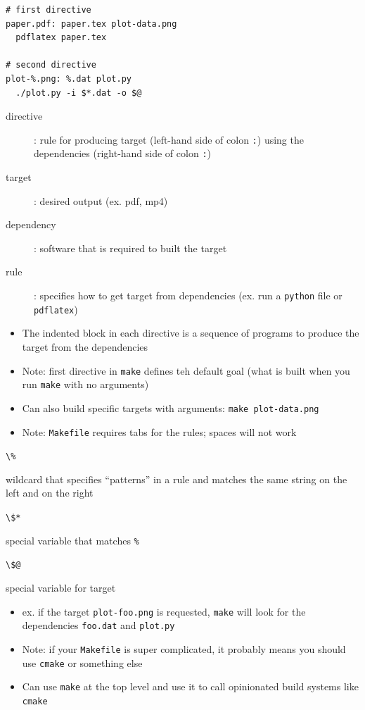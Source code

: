 \documentclass[letterpaper,12pt]{article}
\newcommand*{\lstitem}[1]{
  \setbox0\hbox{\lstinline{#1}}
  \item[\usebox0]
}
\begin{document}
\begin{lstlisting}
# first directive
paper.pdf: paper.tex plot-data.png
  pdflatex paper.tex

# second directive
plot-%.png: %.dat plot.py
  ./plot.py -i $*.dat -o $@
\end{lstlisting}

\begin{description}
 \item[directive]: rule for producing target (left-hand side of colon \lstinline{:})  using the dependencies (right-hand side of colon \lstinline{:})
 \item[target]: desired output (ex. pdf, mp4)
 \item[dependency]: software that is required to built the target
 \item[rule]: specifies how to get target from dependencies (ex. run a \lstinline{python} file or \lstinline{pdflatex})
\end{description}

\begin{itemize}
 \item The indented block in each directive is a sequence of programs to produce the target from the dependencies
 \item Note: first directive in \lstinline{make} defines teh default goal (what is built when you run \lstinline{make} with no arguments)
 \item Can also build specific targets with arguments: \lstinline{make plot-data.png}
 \item Note: \lstinline{Makefile} requires tabs for the rules; spaces will not work
\end{itemize}

\begin{description}
 \lstitem{\%} wildcard that specifies ``patterns'' in a rule and matches the same string on the left and on the right
 \lstitem{\$*} special variable that matches \lstinline{%}
 \lstitem{\$@} special variable for target
\end{description}

\begin{itemize}
 \item ex. if the target \lstinline{plot-foo.png} is requested, \lstinline{make} will look for the dependencies \lstinline{foo.dat} and \lstinline{plot.py}
 \item Note: if your \lstinline{Makefile} is super complicated, it probably means you should use \lstinline{cmake} or something else
 \item Can use \lstinline{make} at the top level and use it to call opinionated build systems like \lstinline{cmake}
\end{itemize}
\end{document}
